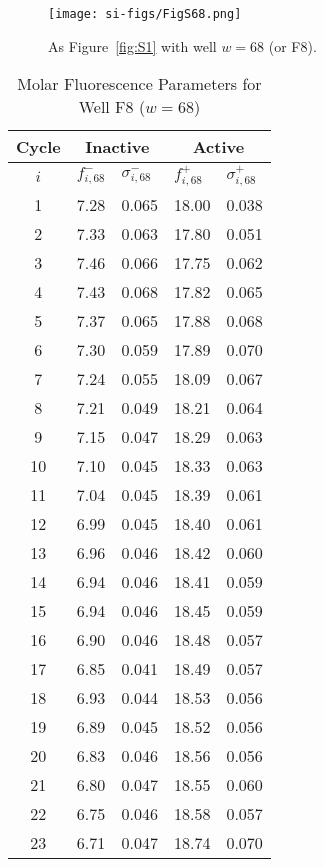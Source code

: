                 \begin{figure}
                    \centering
                    \texttt{[image: si-figs/FigS68.png]}
                    \caption{
                        As Figure~\ref{fig:S1} with well $w=68$ (or F8).
                    }
                \end{figure}
                \clearpage
    \begin{table}
        \caption{Molar Fluorescence Parameters for Well F8 ($w=68$)}
        \centering
        \begin{tabular}{c|ll|ll}
            Cycle & \multicolumn{2}{c|}{Inactive} & \multicolumn{2}{c}{Active} \\
            \hline
            $i$ & $f_{i,68}^{-}$ & $\sigma_{i,68}^{-}$ &  $f_{i,68}^{+}$ & $\sigma_{i,68}^{+}$ \\
            \hline
    1 & 7.28 & 0.065 & 18.00 & 0.038 \\
2 & 7.33 & 0.063 & 17.80 & 0.051 \\
3 & 7.46 & 0.066 & 17.75 & 0.062 \\
4 & 7.43 & 0.068 & 17.82 & 0.065 \\
5 & 7.37 & 0.065 & 17.88 & 0.068 \\
6 & 7.30 & 0.059 & 17.89 & 0.070 \\
7 & 7.24 & 0.055 & 18.09 & 0.067 \\
8 & 7.21 & 0.049 & 18.21 & 0.064 \\
9 & 7.15 & 0.047 & 18.29 & 0.063 \\
10 & 7.10 & 0.045 & 18.33 & 0.063 \\
11 & 7.04 & 0.045 & 18.39 & 0.061 \\
12 & 6.99 & 0.045 & 18.40 & 0.061 \\
13 & 6.96 & 0.046 & 18.42 & 0.060 \\
14 & 6.94 & 0.046 & 18.41 & 0.059 \\
15 & 6.94 & 0.046 & 18.45 & 0.059 \\
16 & 6.90 & 0.046 & 18.48 & 0.057 \\
17 & 6.85 & 0.041 & 18.49 & 0.057 \\
18 & 6.93 & 0.044 & 18.53 & 0.056 \\
19 & 6.89 & 0.045 & 18.52 & 0.056 \\
20 & 6.83 & 0.046 & 18.56 & 0.056 \\
21 & 6.80 & 0.047 & 18.55 & 0.060 \\
22 & 6.75 & 0.046 & 18.58 & 0.057 \\
23 & 6.71 & 0.047 & 18.74 & 0.070 \\

\end{tabular}
\end{table}
